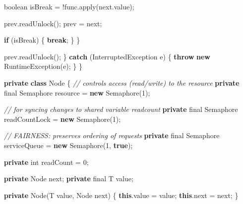 \documentclass[11pt]{article}
\newenvironment{Shaded}{}{}
\newcommand{\KeywordTok}[1]{\textcolor[rgb]{0.00,0.44,0.13}{\textbf{{#1}}}}
\newcommand{\DataTypeTok}[1]{\textcolor[rgb]{0.56,0.13,0.00}{{#1}}}
\newcommand{\DecValTok}[1]{\textcolor[rgb]{0.25,0.63,0.44}{{#1}}}
\newcommand{\CommentTok}[1]{\textcolor[rgb]{0.38,0.63,0.69}{\textit{{#1}}}}
\newcommand{\FunctionTok}[1]{\textcolor[rgb]{0.02,0.16,0.49}{{#1}}}
\newcommand{\NormalTok}[1]{{#1}}
\newcommand{\ControlFlowTok}[1]{\textcolor[rgb]{0.00,0.44,0.13}{\textbf{{#1}}}}
\newcommand{\OperatorTok}[1]{\textcolor[rgb]{0.40,0.40,0.40}{{#1}}}
\newcommand{\BuiltInTok}[1]{{#1}}
\begin{document}
\begin{Shaded}
\begin{Highlighting}[]
                \DataTypeTok{boolean}\NormalTok{ isBreak }\OperatorTok{=} \OperatorTok{!}\NormalTok{func}\OperatorTok{.}\FunctionTok{apply}\OperatorTok{(}\NormalTok{next}\OperatorTok{.}\FunctionTok{value}\OperatorTok{);}

\NormalTok{                prev}\OperatorTok{.}\FunctionTok{readUnlock}\OperatorTok{();}
\NormalTok{                prev }\OperatorTok{=}\NormalTok{ next}\OperatorTok{;}

                \ControlFlowTok{if} \OperatorTok{(}\NormalTok{isBreak}\OperatorTok{)} \OperatorTok{\{}
                    \ControlFlowTok{break}\OperatorTok{;}
                \OperatorTok{\}}
            \OperatorTok{\}}

\NormalTok{            prev}\OperatorTok{.}\FunctionTok{readUnlock}\OperatorTok{();}
        \OperatorTok{\}} \ControlFlowTok{catch} \OperatorTok{(}\BuiltInTok{InterruptedException}\NormalTok{ e}\OperatorTok{)} \OperatorTok{\{}
            \ControlFlowTok{throw} \KeywordTok{new} \BuiltInTok{RuntimeException}\OperatorTok{(}\NormalTok{e}\OperatorTok{);}
        \OperatorTok{\}}
    \OperatorTok{\}}

    \KeywordTok{private} \KeywordTok{class} \BuiltInTok{Node} \OperatorTok{\{}
        \CommentTok{// controls access (read/write) to the resource}
        \KeywordTok{private} \DataTypeTok{final} \BuiltInTok{Semaphore}\NormalTok{ resource }\OperatorTok{=} \KeywordTok{new} \BuiltInTok{Semaphore}\OperatorTok{(}\DecValTok{1}\OperatorTok{);}

        \CommentTok{// for syncing changes to shared variable readcount}
        \KeywordTok{private} \DataTypeTok{final} \BuiltInTok{Semaphore}\NormalTok{ readCountLock }\OperatorTok{=} \KeywordTok{new} \BuiltInTok{Semaphore}\OperatorTok{(}\DecValTok{1}\OperatorTok{);}

        \CommentTok{// FAIRNESS: preserves ordering of requests}
        \KeywordTok{private} \DataTypeTok{final} \BuiltInTok{Semaphore}\NormalTok{ serviceQueue }\OperatorTok{=} \KeywordTok{new} \BuiltInTok{Semaphore}\OperatorTok{(}\DecValTok{1}\OperatorTok{,} \KeywordTok{true}\OperatorTok{);}

        \KeywordTok{private} \DataTypeTok{int}\NormalTok{ readCount }\OperatorTok{=} \DecValTok{0}\OperatorTok{;}

        \KeywordTok{private} \BuiltInTok{Node}\NormalTok{ next}\OperatorTok{;}
        \KeywordTok{private} \DataTypeTok{final}\NormalTok{ T value}\OperatorTok{;}

        \KeywordTok{private} \BuiltInTok{Node}\OperatorTok{(}\NormalTok{T value}\OperatorTok{,} \BuiltInTok{Node}\NormalTok{ next}\OperatorTok{)} \OperatorTok{\{}
            \KeywordTok{this}\OperatorTok{.}\FunctionTok{value} \OperatorTok{=}\NormalTok{ value}\OperatorTok{;}
            \KeywordTok{this}\OperatorTok{.}\FunctionTok{next} \OperatorTok{=}\NormalTok{ next}\OperatorTok{;}
        \OperatorTok{\}}


\end{Highlighting}
\end{Shaded}
\end{document}
